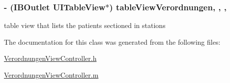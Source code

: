 \subsubsection[{table\+View\+Verordnungen}]{\setlength{\rightskip}{0pt plus 5cm}-\/ (I\+B\+Outlet U\+I\+Table\+View$\ast$) table\+View\+Verordnungen\hspace{0.3cm}{\ttfamily [read]}, {\ttfamily [write]}, {\ttfamily [nonatomic]}, {\ttfamily [weak]}}\label{interface_verordnungen_view_controller_ae01877c9a830e08c00ed79628be912d2}
table view that lists the patients sectioned in stations 

The documentation for this class was generated from the following files\+:\begin{DoxyCompactItemize}
\item 
\hyperlink{_verordnungen_view_controller_8h}{Verordnungen\+View\+Controller.\+h}\item 
\hyperlink{_verordnungen_view_controller_8m}{Verordnungen\+View\+Controller.\+m}\end{DoxyCompactItemize}
